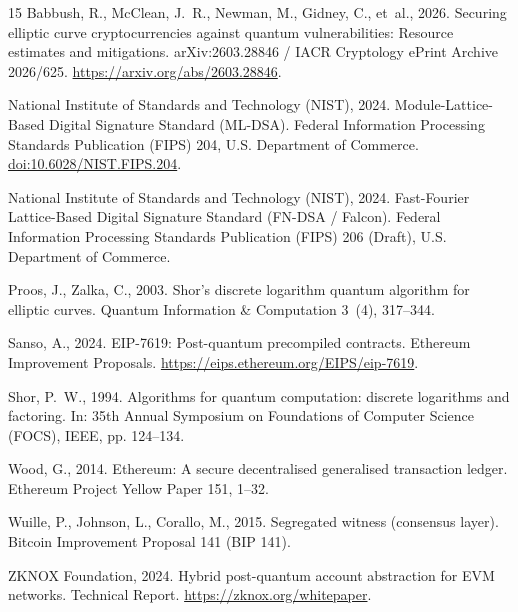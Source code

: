 \documentclass[a4paper,fleqn]{cas-dc}
\begin{document}
\begin{thebibliography}{15}
Babbush, R., McClean, J.~R., Newman, M., Gidney, C., et~al., 2026.
Securing elliptic curve cryptocurrencies against quantum vulnerabilities: Resource estimates and mitigations.
arXiv:2603.28846 / IACR Cryptology ePrint Archive 2026/625. \url{https://arxiv.org/abs/2603.28846}.

National Institute of Standards and Technology (NIST), 2024.
Module-Lattice-Based Digital Signature Standard (ML-DSA).
Federal Information Processing Standards Publication (FIPS) 204, U.S. Department of Commerce. \href{https://doi.org/10.6028/NIST.FIPS.204}{doi:10.6028/NIST.FIPS.204}.

National Institute of Standards and Technology (NIST), 2024.
Fast-Fourier Lattice-Based Digital Signature Standard (FN-DSA / Falcon).
Federal Information Processing Standards Publication (FIPS) 206 (Draft), U.S. Department of Commerce.

Proos, J., Zalka, C., 2003.
Shor's discrete logarithm quantum algorithm for elliptic curves.
Quantum Information \& Computation 3~(4), 317--344.

Sanso, A., 2024.
EIP-7619: Post-quantum precompiled contracts.
Ethereum Improvement Proposals. \url{https://eips.ethereum.org/EIPS/eip-7619}.

Shor, P.~W., 1994.
Algorithms for quantum computation: discrete logarithms and factoring.
In: 35th Annual Symposium on Foundations of Computer Science (FOCS), IEEE, pp. 124--134.

Wood, G., 2014.
Ethereum: A secure decentralised generalised transaction ledger.
Ethereum Project Yellow Paper 151, 1--32.

Wuille, P., Johnson, L., Corallo, M., 2015.
Segregated witness (consensus layer).
Bitcoin Improvement Proposal 141 (BIP 141).

ZKNOX Foundation, 2024.
Hybrid post-quantum account abstraction for EVM networks.
Technical Report. \url{https://zknox.org/whitepaper}.

\end{thebibliography}
\end{document}
